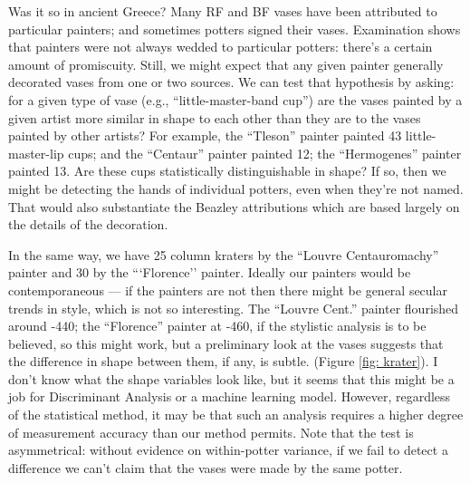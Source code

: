 \documentclass[onecolumn,10pt]{article}
\begin{document}
\begin{enumerate}
Was it so in ancient Greece? Many RF and BF vases have been attributed to particular painters; and sometimes potters signed their vases. Examination shows that painters were not always wedded to particular potters: there's a certain amount of promiscuity.  Still, we might expect that any given painter generally decorated vases from one or two sources.  We can test that hypothesis by asking: for a given type of vase (e.g., ``little-master-band cup'') are the vases painted by a given artist more similar in shape to each other than they are to the vases painted by other artists?  For example, the ``Tleson'' painter painted 43 little-master-lip cups; and the ``Centaur'' painter painted 12; the ``Hermogenes'' painter painted 13. Are these cups statistically distinguishable in shape? If so, then we might be detecting the hands of individual potters, even when they're not named. That would also substantiate the Beazley attributions which are based largely on the details of the decoration.  

In the same way, we have 25 column kraters by the ``Louvre Centauromachy'' painter and 30 by the ```Florence'' painter.  Ideally our painters would be contemporaneous --- if the painters are not then there might be general secular trends in style, which is not so interesting. The ``Louvre Cent.'' painter flourished around -440; the ``Florence'' painter at -460, if the stylistic analysis is to be believed, so this might work, but a preliminary look at the vases suggests that the difference in shape between them, if any, is subtle. (Figure \ref{fig: krater}). I don't know what the shape variables look like, but it seems that this might be a job for Discriminant Analysis or a machine learning model. However, regardless of the statistical method, it may be that such an analysis requires a higher degree of measurement accuracy than our method permits. Note that the test is asymmetrical: without evidence on within-potter variance, if we fail to detect a difference we can't claim that the vases were made by the same potter. 


\end{enumerate}
\end{document}
